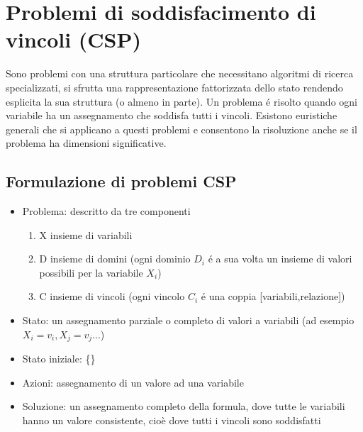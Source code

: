 \documentclass{article}
\begin{document}
\section{Problemi di soddisfacimento di vincoli (CSP)}
Sono problemi con una struttura particolare che necessitano algoritmi di ricerca specializzati, si sfrutta una rappresentazione fattorizzata dello stato rendendo esplicita la sua struttura (o almeno in parte). Un problema é risolto quando ogni variabile ha un assegnamento che soddisfa tutti i vincoli. Esistono euristiche generali che si applicano a questi problemi e consentono la risoluzione anche se il problema ha dimensioni significative.
\subsection{Formulazione di problemi CSP}
\begin{itemize}
    \item Problema: descritto da tre componenti
        \begin{enumerate}
        \item X insieme di variabili
        \item D insieme di domini (ogni dominio $D_i$ é a sua volta un insieme di valori possibili per la variabile $X_i$)
        \item C insieme di vincoli (ogni vincolo $C_i$ é una coppia [variabili,relazione])
        \end{enumerate}
    \item Stato: un assegnamento parziale o completo di valori a variabili (ad esempio $X_i = v_i, X_j = v_j$...)
    \item Stato iniziale: \{\}
    \item Azioni: assegnamento di un valore ad una variabile
    \item Soluzione: un assegnamento completo della formula, dove tutte le variabili hanno un valore consistente, cioè dove tutti i vincoli sono soddisfatti
\end{itemize}
\end{document}
